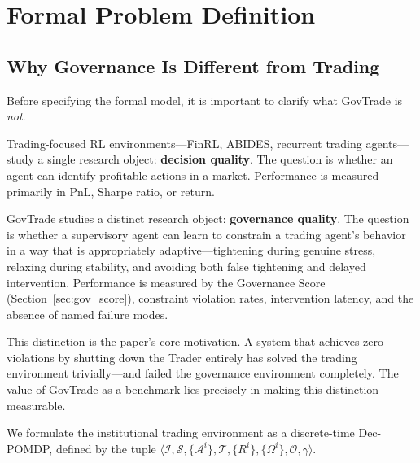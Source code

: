 \documentclass[11pt]{article}
\begin{document}
\section{Formal Problem Definition}
\label{sec:problem}

\subsection{Why Governance Is Different from Trading}
\label{sec:gov_vs_trading}

Before specifying the formal model, it is important to clarify what GovTrade is \emph{not}.

Trading-focused RL environments---FinRL, ABIDES, recurrent trading agents---study a single research object: \textbf{decision quality}. The question is whether an agent can identify profitable actions in a market. Performance is measured primarily in PnL, Sharpe ratio, or return.

GovTrade studies a distinct research object: \textbf{governance quality}. The question is whether a supervisory agent can learn to constrain a trading agent's behavior in a way that is appropriately adaptive---tightening during genuine stress, relaxing during stability, and avoiding both false tightening and delayed intervention. Performance is measured by the Governance Score (Section~\ref{sec:gov_score}), constraint violation rates, intervention latency, and the absence of named failure modes.

This distinction is the paper's core motivation. A system that achieves zero violations by shutting down the Trader entirely has solved the trading environment trivially---and failed the governance environment completely. The value of GovTrade as a benchmark lies precisely in making this distinction measurable.

We formulate the institutional trading environment as a discrete-time Dec-POMDP, defined by the tuple $\langle \mathcal{I}, \mathcal{S}, \{\mathcal{A}^i\}, \mathcal{T}, \{R^i\}, \{\Omega^i\}, \mathcal{O}, \gamma \rangle$.
\end{document}
